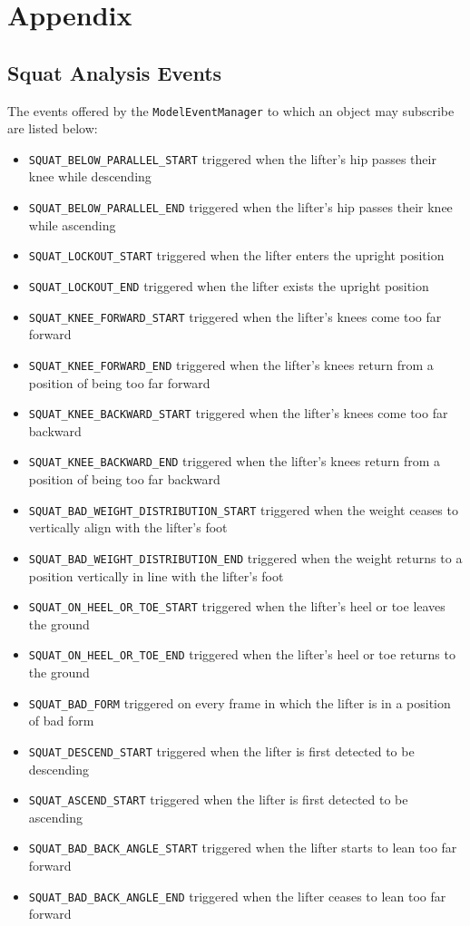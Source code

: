 \chapter{Appendix}

\section{Squat Analysis Events}
\label{sec:appendix_events}

The events offered by the \texttt{ModelEventManager} to which an object may subscribe are listed below:

\begin{itemize}
	\item \texttt{SQUAT\_BELOW\_PARALLEL\_START} triggered when the lifter's hip passes their knee while descending
	\item \texttt{SQUAT\_BELOW\_PARALLEL\_END} triggered when the lifter's hip passes their knee while ascending
	\item \texttt{SQUAT\_LOCKOUT\_START} triggered when the lifter enters the upright position
	\item \texttt{SQUAT\_LOCKOUT\_END} triggered when the lifter exists the upright position
	\item \texttt{SQUAT\_KNEE\_FORWARD\_START} triggered when the lifter's knees come too far forward
	\item \texttt{SQUAT\_KNEE\_FORWARD\_END} triggered when the lifter's knees return from a position of being too far forward
	\item \texttt{SQUAT\_KNEE\_BACKWARD\_START} triggered when the lifter's knees come too far backward
	\item \texttt{SQUAT\_KNEE\_BACKWARD\_END} triggered when the lifter's knees return from a position of being too far backward
	\item \texttt{SQUAT\_BAD\_WEIGHT\_DISTRIBUTION\_START} triggered when the weight ceases to vertically align with the lifter's foot
	\item \texttt{SQUAT\_BAD\_WEIGHT\_DISTRIBUTION\_END} triggered when the weight returns to a position vertically in line with the lifter's foot
	\item \texttt{SQUAT\_ON\_HEEL\_OR\_TOE\_START} triggered when the lifter's heel or toe leaves the ground
	\item \texttt{SQUAT\_ON\_HEEL\_OR\_TOE\_END} triggered when the lifter's heel or toe returns to the ground
	\item \texttt{SQUAT\_BAD\_FORM} triggered on every frame in which the lifter is in a position of bad form
	\item \texttt{SQUAT\_DESCEND\_START} triggered when the lifter is first detected to be descending
	\item \texttt{SQUAT\_ASCEND\_START} triggered when the lifter is first detected to be ascending
	\item \texttt{SQUAT\_BAD\_BACK\_ANGLE\_START} triggered when the lifter starts to lean too far forward
	\item \texttt{SQUAT\_BAD\_BACK\_ANGLE\_END} triggered when the lifter ceases to lean too far forward
\end{itemize}


